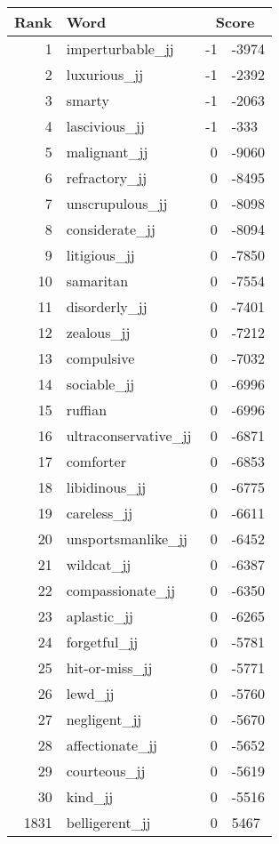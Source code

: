 \begin{longtable}[!htbp]{| rlr@{.}l |}
    \hline
    \textbf{Rank} & \textbf{Word} & \multicolumn{2}{c|}{\textbf{Score}} \\
    \hline
    \endhead
    1 & imperturbable\_jj & -1 & -3974 \\
    2 & luxurious\_jj & -1 & -2392 \\
    3 & smarty & -1 & -2063 \\
    4 & lascivious\_jj & -1 & -333 \\
    5 & malignant\_jj & 0 & -9060 \\
    6 & refractory\_jj & 0 & -8495 \\
    7 & unscrupulous\_jj & 0 & -8098 \\
    8 & considerate\_jj & 0 & -8094 \\
    9 & litigious\_jj & 0 & -7850 \\
    10 & samaritan & 0 & -7554 \\
    11 & disorderly\_jj & 0 & -7401 \\
    12 & zealous\_jj & 0 & -7212 \\
    13 & compulsive & 0 & -7032 \\
    14 & sociable\_jj & 0 & -6996 \\
    15 & ruffian & 0 & -6996 \\
    16 & ultraconservative\_jj & 0 & -6871 \\
    17 & comforter & 0 & -6853 \\
    18 & libidinous\_jj & 0 & -6775 \\
    19 & careless\_jj & 0 & -6611 \\
    20 & unsportsmanlike\_jj & 0 & -6452 \\
    21 & wildcat\_jj & 0 & -6387 \\
    22 & compassionate\_jj & 0 & -6350 \\
    23 & aplastic\_jj & 0 & -6265 \\
    24 & forgetful\_jj & 0 & -5781 \\
    25 & hit-or-miss\_jj & 0 & -5771 \\
    26 & lewd\_jj & 0 & -5760 \\
    27 & negligent\_jj & 0 & -5670 \\
    28 & affectionate\_jj & 0 & -5652 \\
    29 & courteous\_jj & 0 & -5619 \\
    30 & kind\_jj & 0 & -5516 \\
    1831 & belligerent\_jj & 0 & 5467 \\

\end{longtable}
